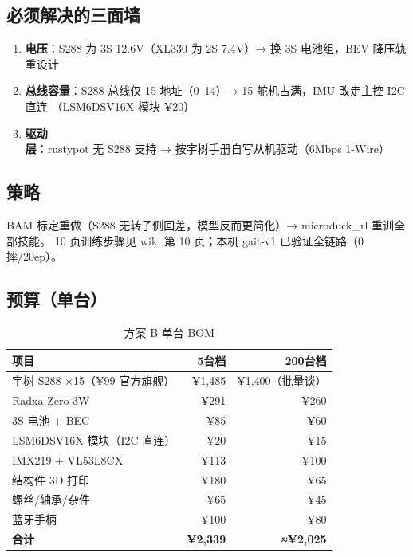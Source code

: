 \documentclass[11pt,a4paper]{ctexart}
\begin{document}
\subsection{必须解决的三面墙}
\begin{enumerate}\itemsep0pt
\item \textbf{电压}：S288 为 3S 12.6V（XL330 为 2S 7.4V）→ 换 3S 电池组，BEV 降压轨重设计
\item \textbf{总线容量}：S288 总线仅 15 地址（0--14）→ 15 舵机占满，IMU 改走主控 I2C 直连
  （LSM6DSV16X 模块 ¥20）
\item \textbf{驱动层}：rustypot 无 S288 支持 → 按宇树手册自写从机驱动（6Mbps 1-Wire）
\end{enumerate}
\subsection{策略}
BAM 标定重做（S288 无转子侧回差，模型反而更简化）→ microduck\_rl 重训全部技能。
10 页训练步骤见 wiki 第 10 页；本机 gait-v1 已验证全链路（0 摔/20ep）。
\subsection{预算（单台）}
\begin{table}[h]\centering\small
\begin{tabular}{@{}L{5.5cm}rr@{}}
\toprule
{} 项目 & 5台档 & 200台档\\
\midrule
宇树 S288 ×15（¥99 官方旗舰） & ¥1{,}485 & ¥1{,}400（批量谈）\\
Radxa Zero 3W & ¥291 & ¥260\\
3S 电池 + BEC & ¥85 & ¥60\\
LSM6DSV16X 模块（I2C 直连） & ¥20 & ¥15\\
IMX219 + VL53L8CX & ¥113 & ¥100\\
结构件 3D 打印 & ¥180 & ¥65\\
螺丝/轴承/杂件 & ¥65 & ¥45\\
蓝牙手柄 & ¥100 & ¥80\\
\midrule
\textbf{合计} & \textbf{¥2{,}339} & \textbf{≈¥2{,}025}\\
\bottomrule
\end{tabular}
\caption{方案 B 单台 BOM}
\end{table}

\end{document}
